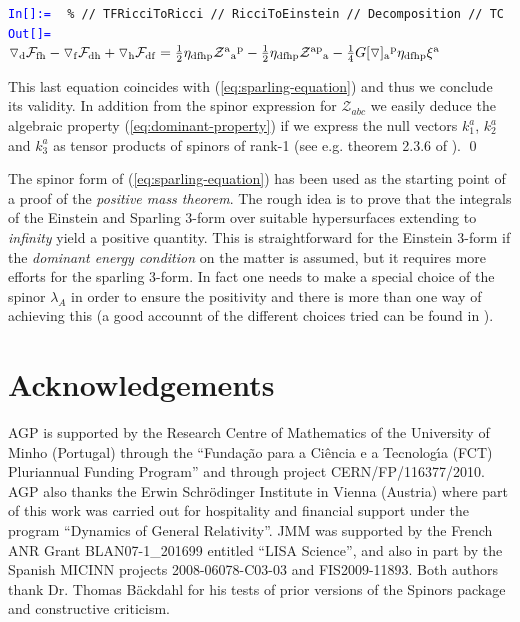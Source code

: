 \documentclass[final,3p,times,twocolumn]{elsarticle}
\newcounter{mathex}
\newcommand{\Mathsize}{\scriptsize}
\newcommand{\MathIn}[2]{ {\textcolor{blue}{\tt In[\arabic{#1}]:=} }\ { \tt #2 } \\[1mm] }
\newcommand{\MathOut}[1]{{\textcolor{blue}{\tt Out[\arabic{#1}]=}}\ \ }
\begin{document}
\begin{flushleft}
\Mathsize
{}
\MathIn{mathex}{\% // TFRicciToRicci // RicciToEinstein // Decomposition // TC}
\MathOut{mathex} \\
{\tt  $\triangledown_{\rm d}\mathcal{F}_{\rm fh} -  
\triangledown_{\rm f}\mathcal{F}_{\rm dh} + 
\triangledown_{\rm h}\mathcal{F}_{\rm df} =
\frac{1}{2} \eta_{\rm dfhp} \mathcal{Z}^{\rm a}{}_{\rm a}{}^{\rm p} - 
\frac{1}{2}\eta_{\rm dfhp} \mathcal{Z}^{\rm ap}{}_{\rm a} - 
\frac{1}{4}G[\triangledown]_{\rm a}{}^{\rm p} \eta_{\rm dfhp} \xi^{\rm a}$}
\end{flushleft}

This last equation coincides with (\ref{eq:sparling-equation}) and thus we conclude its validity. 
In addition from the spinor expression for  
$\mathcal{Z}_{abc}$ we easily deduce the algebraic property 
(\ref{eq:dominant-property}) if we express the null vectors $k^a_1$, $k^a_2$ and 
$k^a_3$ as tensor products of spinors of rank-1 
(see e.g. theorem 2.3.6 of \cite{STEWART}). \qed  


The spinor form of (\ref{eq:sparling-equation}) has been used as the starting
point of a proof of the {\em positive mass theorem}. The rough idea is to prove that the integrals of the Einstein and Sparling 3-form over suitable hypersurfaces extending to 
{\em infinity} yield a positive quantity. This is straightforward for the Einstein 
3-form if the {\em dominant energy condition} on the matter is assumed, but it 
requires more efforts for the sparling 3-form. In fact one needs to make 
a special choice of the spinor $\lambda_A$ in order to ensure the positivity and
there is more than one way of achieving this (a good accounnt of the different
choices tried can be found in \cite{BERGQVIST-POSITIVITY}).    

\section*{Acknowledgements}
AGP is supported by the Research Centre of Mathematics of the University of
Minho (Portugal) through the ``Funda\c{c}\~ao para a Ci\^encia e a Tecnolog\'{\i}a (FCT) Pluriannual
Funding Program'' and through project CERN/FP/116377/2010. 
AGP also thanks the Erwin Schr\"odinger Institute in Vienna (Austria) 
where part of this work was carried out for hospitality and financial support 
under the program ``Dynamics of General Relativity''.
JMM was supported by the French ANR Grant BLAN07-1\_201699 entitled
``LISA Science'', and also in part by the Spanish MICINN projects
2008-06078-C03-03 and FIS2009-11893. Both authors thank Dr. Thomas B\"ackdahl 
for his tests of prior versions of the Spinors package and constructive criticism. 
\end{document}
